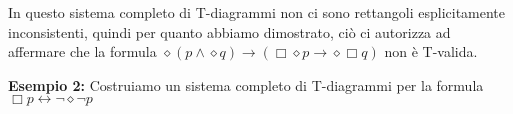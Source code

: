 \documentclass[a4paper, titlepage, 12pt]{report}
\begin{document}

In questo sistema completo di T-diagrammi non ci sono rettangoli esplicitamente
inconsistenti, quindi per quanto abbiamo dimostrato, ciò ci autorizza ad affermare
che la formula
$\diamond (p \land \diamond q) \rightarrow (\Box \diamond p \rightarrow \diamond \Box q)$
non è T-valida.

\textbf{Esempio 2:}
Costruiamo un sistema completo di T-diagrammi per la formula
$\Box p \leftrightarrow \neg \diamond \neg p$
\end{document}
